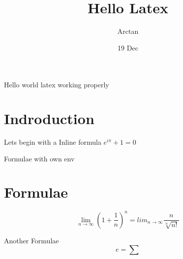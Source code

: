 \documentclass{article}
\title{Hello Latex}
\author{Arctan}
\date{19 Dec}
\begin{document}
    \maketitle
    Hello world  latex working properly
    \section{Indroduction}

    Lets begin with a Inline formula $e^{i\pi} + 1 =0$

Formulae with own env
    \section{Formulae}
    $$ \lim_{n\to\infty} \left(1+\frac{1}{n}\right)^n = lim_{n\to\infty}\frac{n}{\sqrt[n]{n!}} $$

    Another Formulae
    $$e = \sum$$
\end{document}
